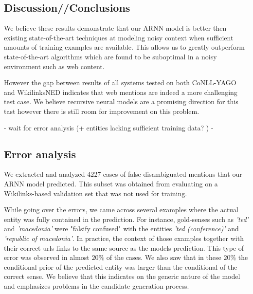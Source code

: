 \documentclass[11pt]{article}
\begin{document}
\subsection{Discussion//Conclusions}
We believe these results demonstrate that our ARNN model is better then existing state-of-the-art techniques at modeling noisy context when sufficient amounts of training examples are available. This allows us to greatly outperform state-of-the-art algorithms which are found to be suboptimal in a noisy environment such as web content. 

However the gap between results of all systems tested on both CoNLL-YAGO and WikilinksNED indicates that web mentions are indeed a more challenging test case. We believe recursive neural models are a promising direction for this tast however there is still room for improvement on this problem. 

- wait for error analysis (+ entities lacking sufficient training data? ) -

\subsection{Error analysis}

We extracted and analyzed $4227$ cases of false disambiguated mentions that our ARNN model predicted. This subset was obtained from evaluating on a Wikilinks-based validation set that was not used for training. 

While going over the errors, we came across several examples where the actual entity was fully contained in the prediction. For instance, gold-senses such as \textit{'ted'} and \textit{'macedonia'} were "falsify confused" with the entities \textit{'ted (conference)'} and \textit{'republic of macedonia'}. In practice, the context of those examples together with their correct urls links to the same source as the models prediction. This type of error was observed in almost $20$\% of the cases. We also saw that in these $20$\% the conditional prior of the predicted entity was larger than the conditional of the correct sense. We believe that this indicates on the generic nature of the model and emphasizes problems in the candidate generation process.
\end{document}
